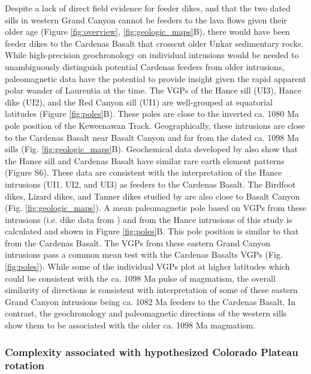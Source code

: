 \documentclass[draft]{agujournal2019}
\begin{document}
Despite a lack of direct field evidence for feeder dikes, and that the two dated sills in western Grand Canyon cannot be feeders to the lava flows given their older age (Figure \ref{fig:overview}, \ref{fig:geologic_maps}B), there would have been feeder dikes to the Cardenas Basalt that crosscut older Unkar sedimentary rocks. While high-precision geochronology on individual intrusions would be needed to unambiguously distinguish potential Cardenas feeders from older intrusions, paleomagnetic data have the potential to provide insight given the rapid apparent polar wander of Laurentia at the time. The VGPs of the Hance sill (UI3), Hance dike (UI2), and the Red Canyon sill (UI1) are well-grouped at equatorial latitudes (Figure \ref{fig:poles}B). These poles are close to the inverted ca. 1080 Ma pole position of the Keweenawan Track. Geographically, these intrusions are close to the Cardenas Basalt near Basalt Canyon and far from the dated ca. 1098 Ma sills (Fig. \ref{fig:geologic_maps}B). Geochemical data developed by  also show that the Hance sill and Cardenas Basalt have similar rare earth element patterns (Figure S6). These data are consistent with the interpretation of the Hance intrusions (UI1, UI2, and UI3) as feeders to the Cardenas Basalt. The Birdfoot dikes, Lizard dikes, and Tanner dikes studied by  are also close to Basalt Canyon (Fig. \ref{fig:geologic_maps}). A mean paleomagnetic pole based on VGPs from these intrusions (i.e. dike data from ) and from the Hance intrusions of this study is calculated and shown in Figure \ref{fig:poles}B. This pole position is similar to that from the Cardenas Basalt. The VGPs from these eastern Grand Canyon intrusions pass a common mean test with the Cardenas Basalts VGPs (Fig. \ref{fig:poles}). While some of the individual VGPs plot at higher latitudes which could be consistent
with the ca. 1098 Ma pulse of magmatism, the overall similarity of directions is consistent with interpretation of some of these eastern Grand Canyon intrusions being ca. 1082 Ma feeders to the Cardenas Basalt. In contrast, the geochronology and paleomagnetic directions of the western sills show them to be associated with the older ca. 1098 Ma magmatism. 

\subsubsection*{Complexity associated with hypothesized Colorado Plateau rotation}
\end{document}
